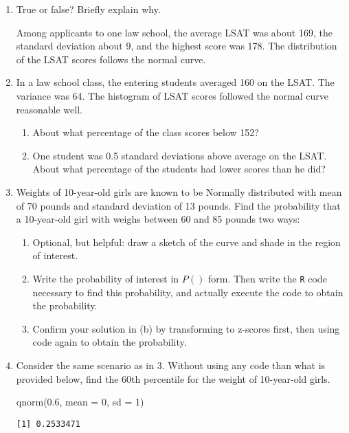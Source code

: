 \documentclass[
  letterpaper,
  DIV=11,
  numbers=noendperiod]{scrartcl}
\newenvironment{Shaded}{\begin{snugshade}}{\end{snugshade}}
\newcommand{\AttributeTok}[1]{\textcolor[rgb]{0.40,0.45,0.13}{#1}}
\newcommand{\DecValTok}[1]{\textcolor[rgb]{0.68,0.00,0.00}{#1}}
\newcommand{\FloatTok}[1]{\textcolor[rgb]{0.68,0.00,0.00}{#1}}
\newcommand{\FunctionTok}[1]{\textcolor[rgb]{0.28,0.35,0.67}{#1}}
\newcommand{\NormalTok}[1]{\textcolor[rgb]{0.00,0.23,0.31}{#1}}
\begin{document}
\begin{enumerate}
\def\labelenumi{\arabic{enumi}.}
\item
  True or false? Briefly explain why.

  Among applicants to one law school, the average LSAT was about 169,
  the standard deviation about 9, and the highest score was 178. The
  distribution of the LSAT scores follows the normal curve.
\item
  In a law school class, the entering students averaged 160 on the LSAT.
  The variance was 64. The histogram of LSAT scores followed the normal
  curve reasonable well.

  \begin{enumerate}
  \def\labelenumii{\alph{enumii}.}
  \item
    About what percentage of the class scores below 152?
  \item
    One student was 0.5 standard deviations above average on the LSAT.
    About what percentage of the students had lower scores than he did?
  \end{enumerate}
\item
  Weights of 10-year-old girls are known to be Normally distributed with
  mean of 70 pounds and standard deviation of 13 pounds. Find the
  probability that a 10-year-old girl with weighs between 60 and 85
  pounds two ways:

  \begin{enumerate}
  \def\labelenumii{\alph{enumii}.}
  \item
    Optional, but helpful: draw a sketch of the curve and shade in the
    region of interest.
  \item
    Write the probability of interest in \(P()\) form. Then write the
    \texttt{R} code necessary to find this probability, and actually
    execute the code to obtain the probability.
  \item
    Confirm your solution in (b) by transforming to z-scores first, then
    using code again to obtain the probability.
  \end{enumerate}
\item
  Consider the same scenario as in 3. Without using any code than what
  is provided below, find the 60th percentile for the weight of
  10-year-old girls.

\begin{Shaded}
\begin{Highlighting}[]
\FunctionTok{qnorm}\NormalTok{(}\FloatTok{0.6}\NormalTok{, }\AttributeTok{mean =} \DecValTok{0}\NormalTok{, }\AttributeTok{sd =} \DecValTok{1}\NormalTok{)}
\end{Highlighting}
\end{Shaded}

\begin{verbatim}
[1] 0.2533471
\end{verbatim}
\end{enumerate}
\end{document}
